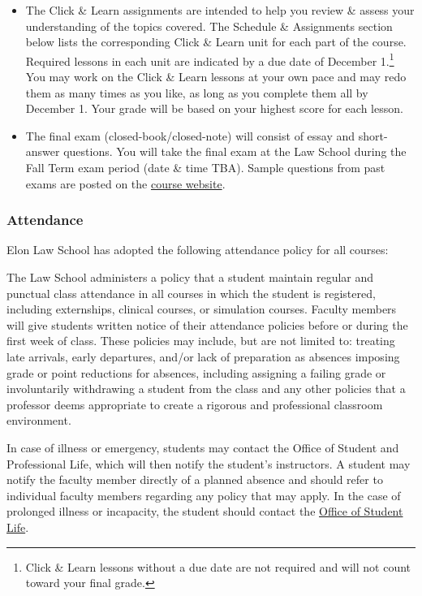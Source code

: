 \documentclass[11pt,letterpaper,twoside]{article}
\providecommand{\tightlist}{%
\setlength{\itemsep}{0em}\setlength{\parskip}{0em}\setlength{\itemindent}{0em}}
\renewenvironment{quote}{%
   \list{}{%
     \leftmargin2em   %
     \rightmargin\leftmargin\parsep .1em }
   \item\relax
}
{\endlist}
\begin{document}
\begin{itemize}
\tightlist
\item
  The Click \& Learn assignments are intended to help you review \&
  assess your understanding of the topics covered. The Schedule \&
  Assignments section below lists the corresponding Click \& Learn unit
  for each part of the course. Required lessons in each unit are
  indicated by a due date of December 1.\footnote{Click \& Learn lessons
    without a due date are not required and will not count toward your
    final grade.} You may work on the Click \& Learn lessons at your own
  pace and may redo them as many times as you like, as long as you
  complete them all by December 1. Your grade will be based on your
  highest score for each lesson.
\item
  The final exam (closed-book/closed-note) will consist of essay and
  short-answer questions. You will take the final exam at the Law School
  during the Fall Term exam period (date \& time TBA). Sample questions
  from past exams are posted on the
  \href{https://www.emfink.net/CivPro/}{course website}.
\end{itemize}

\subsubsection{Attendance}\label{attendance}

Elon Law School has adopted the following attendance policy for all
courses:

\begin{quote}
The Law School administers a policy that a student maintain regular and
punctual class attendance in all courses in which the student is
registered, including externships, clinical courses, or simulation
courses. Faculty members will give students written notice of their
attendance policies before or during the first week of class. These
policies may include, but are not limited to: treating late arrivals,
early departures, and/or lack of preparation as absences imposing grade
or point reductions for absences, including assigning a failing grade or
involuntarily withdrawing a student from the class and any other
policies that a professor deems appropriate to create a rigorous and
professional classroom environment.

In case of illness or emergency, students may contact the Office of
Student and Professional Life, which will then notify the student's
instructors. A student may notify the faculty member directly of a
planned absence and should refer to individual faculty members regarding
any policy that may apply. In the case of prolonged illness or
incapacity, the student should contact the
\href{https://www.elon.edu/u/law/students/}{Office of Student Life}.
\end{quote}
\end{document}
